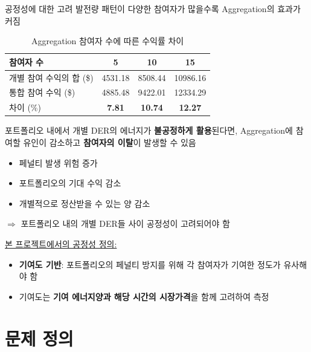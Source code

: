 \documentclass[xcolor=dvipsnames,t,9pt]{beamer}
\begin{document}
\begin{frame}{공정성에 대한 고려}
    발전량 패턴이 다양한 참여자가 많을수록 Aggregation의 효과가 커짐
    \vspace{-1em}
    \begin{table}[]
        \caption{Aggregation 참여자 수에 따른 수익률 차이}
        \footnotesize
        \begin{tabular}{lccc}
            \hline
            참여자 수            & 5             & 10             & 15             \\ \hline
            개별 참여 수익의 합 (\$) & 4531.18       & 8508.44        & 10986.16       \\
            통합 참여 수익 (\$)    & 4885.48       & 9422.01        & 12334.29       \\ \hline
            차이 (\%)          & \textbf{7.81} & \textbf{10.74} & \textbf{12.27} \\ \hline
        \end{tabular}
    \end{table}
    \vspace{-0.5em}
    \begin{alertblock}{}
        포트폴리오 내에서 개별 DER의 에너지가 \textbf{불공정하게 활용}된다면, Aggregation에 참여할 유인이 감소하고 \textbf{참여자의 이탈}이 발생할 수 있음
        \begin{itemize}
            \item 페널티 발생 위험 증가
            \item 포트폴리오의 기대 수익 감소
            \item 개별적으로 정산받을 수 있는 양 감소
        \end{itemize}
        $\Rightarrow$ 포트폴리오 내의 개별 DER들 사이 공정성이 고려되어야 함
    \end{alertblock}

    \underline{본 프로젝트에서의 공정성 정의:}
    \begin{itemize}
        \item \textbf{기여도 기반}: 포트폴리오의 페널티 방지를 위해 각 참여자가 기여한 정도가 유사해야 함
        \item 기여도는 \textbf{기여 에너지양과 해당 시간의 시장가격}을 함께 고려하여 측정
    \end{itemize}

\end{frame}

\section[문제 정의]{문제 정의}
\end{document}
